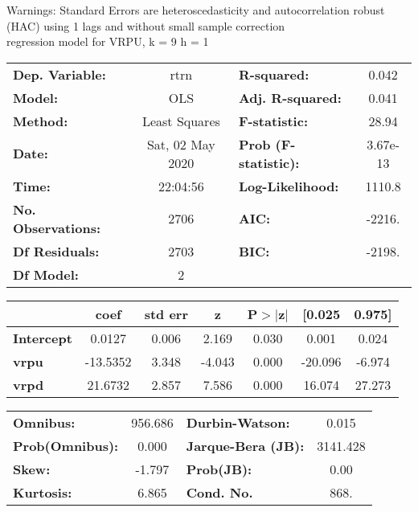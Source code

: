 Warnings: \newline
 [1] Standard Errors are heteroscedasticity and autocorrelation robust (HAC) using 1 lags and without small sample correction\\ 

regression model for VRPU, k = 9 h = 1\begin{center}
\begin{tabular}{lclc}
\toprule
\textbf{Dep. Variable:}    &       rtrn       & \textbf{  R-squared:         } &     0.042   \\
\textbf{Model:}            &       OLS        & \textbf{  Adj. R-squared:    } &     0.041   \\
\textbf{Method:}           &  Least Squares   & \textbf{  F-statistic:       } &     28.94   \\
\textbf{Date:}             & Sat, 02 May 2020 & \textbf{  Prob (F-statistic):} &  3.67e-13   \\
\textbf{Time:}             &     22:04:56     & \textbf{  Log-Likelihood:    } &    1110.8   \\
\textbf{No. Observations:} &        2706      & \textbf{  AIC:               } &    -2216.   \\
\textbf{Df Residuals:}     &        2703      & \textbf{  BIC:               } &    -2198.   \\
\textbf{Df Model:}         &           2      & \textbf{                     } &             \\
\bottomrule
\end{tabular}
\begin{tabular}{lcccccc}
                   & \textbf{coef} & \textbf{std err} & \textbf{z} & \textbf{P$> |$z$|$} & \textbf{[0.025} & \textbf{0.975]}  \\
\midrule
\textbf{Intercept} &       0.0127  &        0.006     &     2.169  &         0.030        &        0.001    &        0.024     \\
\textbf{vrpu}      &     -13.5352  &        3.348     &    -4.043  &         0.000        &      -20.096    &       -6.974     \\
\textbf{vrpd}      &      21.6732  &        2.857     &     7.586  &         0.000        &       16.074    &       27.273     \\
\bottomrule
\end{tabular}
\begin{tabular}{lclc}
\textbf{Omnibus:}       & 956.686 & \textbf{  Durbin-Watson:     } &    0.015  \\
\textbf{Prob(Omnibus):} &   0.000 & \textbf{  Jarque-Bera (JB):  } & 3141.428  \\
\textbf{Skew:}          &  -1.797 & \textbf{  Prob(JB):          } &     0.00  \\
\textbf{Kurtosis:}      &   6.865 & \textbf{  Cond. No.          } &     868.  \\
\bottomrule
\end{tabular}
\end{center}

